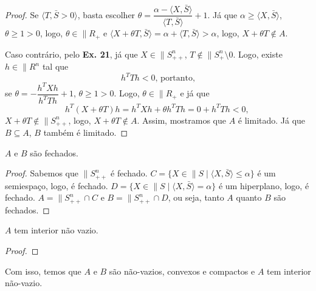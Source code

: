 \begin{homeworkProblemAnswer}
\begin{proof}
Se $\langle T, \bar{S} > 0 \rangle$, basta escolher $\theta = \dfrac{\alpha - \langle X, \bar{S} \rangle}{\langle T, \bar{S} \rangle} + 1$. Já que $\alpha \geq \langle X, \bar{S} \rangle$, $\theta \geq 1 > 0$, logo, $\theta \in \|{R}_+$ e $\langle X + \theta T, \bar{S} \rangle = \alpha + \langle T, \bar{S} \rangle > \alpha$, logo, $X + \theta T \notin A$.  

Caso contrário, pelo \textbf{Ex. 21}, já que $X \in \|{S}_{++}^n$, $T \notin \|{S}_+^n \setminus {0}$. Logo, existe $h \in \|{R}^n$ tal que
$$ h^TTh < 0 \text{, portanto,} $$
se $\theta = -\dfrac{h^TXh}{h^TTh} + 1$, $\theta \geq 1 > 0$. Logo, $\theta \in \|{R}_+$ e já que
$$ h^T(X+\theta T)h = h^TXh + \theta h^TTh = 0 + h^TTh < 0 \text{, } $$
$X + \theta T \notin \|{S}_{++}^n$, logo, $X + \theta T \notin A$. Assim, mostramos que $A$ é limitado. Já que $B \subseteq A$, $B$ também é limitado.
\end{proof}

\begin{prop}\label{prop_abfechados}
$A$ e $B$ são fechados.
\end{prop}
\begin{proof}
Sabemos que $\|{S}_{++}^n$ é fechado. $C = \{X \in \|{S} \mid \langle X, \bar{S} \rangle \leq \alpha\}$ é um semiespaço, logo, é fechado. $D = \{X \in \|{S} \mid \langle X, \bar{S} \rangle = \alpha\}$ é um hiperplano, logo, é fechado. $A = \|{S}_{++}^n \cap C$ e $B = \|{S}_{++}^n \cap D$, ou seja, tanto $A$ quanto $B$ são fechados.
\end{proof}

\begin{prop}
$A$ tem interior não vazio.
\end{prop}
\begin{proof}
\end{proof}

Com isso, temos que $A$ e $B$ são não-vazios, convexos e compactos e $A$ tem interior não-vazio. 
\end{homeworkProblemAnswer}


